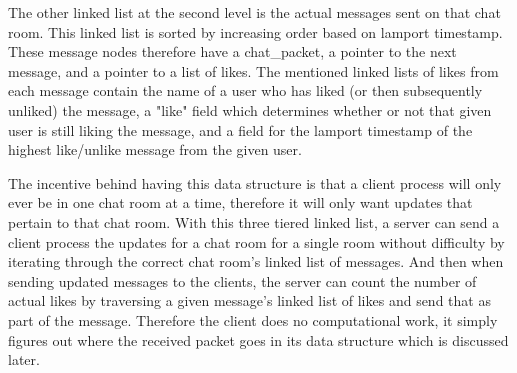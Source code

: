 \documentclass[12pt,journal,compsoc]{IEEEtran}
\begin{document}
The other linked list at the second level is the actual messages sent on that chat room. This linked list is sorted by increasing order based on lamport timestamp. These message nodes therefore have a chat\_packet, a pointer to the next message, and a pointer to a list of likes. The mentioned linked lists of likes from each message contain the name of a user who has liked (or then subsequently unliked) the message, a "like" field which determines whether or not that given user is still liking the message, and a field for the lamport timestamp of the highest like/unlike message from the given user.

The incentive behind having this data structure is that a client process will only ever be in one chat room at a time, therefore it will only want updates that pertain to that chat room. With this three tiered linked list, a server can send a client process the updates for a chat room for a single room without difficulty by iterating through the correct chat room's linked list of messages. And then when sending updated messages to the clients, the server can count the number of actual likes by traversing a given message's linked list of likes and send that as part of the message. Therefore the client does no computational work, it simply figures out where the received packet goes in its data structure which is discussed later.

\end{document}
